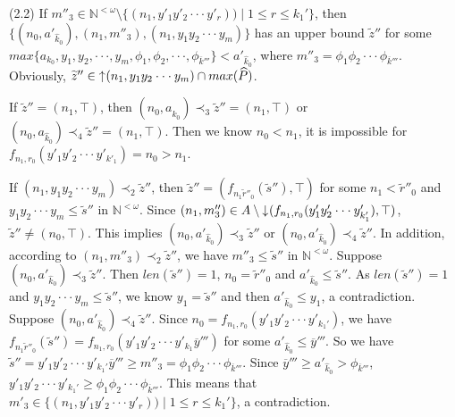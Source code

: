 \documentclass[preprint,12pt]{elsarticle}
\numberwithin{equation}{section}
\newcommand{\dn}{\mathord{\downarrow}\hspace{0.05em}}
\newcommand{\up}{\mathord{\uparrow}\hspace{0.05em}}
\begin{document}
(2.2) If $m''_{3}\in\mathbb{N}^{<\omega}\setminus\{(n_{1},y'_{1}y'_{2}\cdot\cdot\cdot y'_{r}))\mid 1\leq r\leq k_{1}'\}$, then $\{(n_{0},a'_{\widehat{k}_{0}}),(n_{1},m''_{3}),(n_{1},y_{1}y_{2}\cdot\cdot\cdot y_{m})\}$ has an upper bound $\widetilde{z}''$ for some $max\{a_{k_{0}},y_{1},y_{2},\cdot\cdot\cdot,y_{m},\phi_{1},\phi_{2},\cdot\cdot\cdot,\phi_{\overline{k}'''}\}<a'_{\widehat{k}_{0}}$, where $m''_{3}=\phi_{1}\phi_{2}\cdot\cdot\cdot\phi_{\overline{k}'''}$. Obviously, $\widetilde{z}''\in\up(n_{1},y_{1}y_{2}\cdot\cdot\cdot y_{m})\cap max(\widehat{P})$.

If $\widetilde{z}''=(n_{1},\top)$, then  $(n_{0},a_{\widehat{k}_{0}})\prec_{3}\widetilde{z}''=(n_{1},\top)$ or $(n_{0},a_{\widehat{k}_{0}})\prec_{4}\widetilde{z}''=(n_{1},\top)$. Then we know $n_{0}<n_{1}$, it is impossible for $f_{n_{1},r_{0}}(y'_{1}y'_{2}\cdot\cdot\cdot y'_{k'_{1}})=n_{0}>n_{1}$.

If $(n_{1},y_{1}y_{2}\cdot\cdot\cdot y_{m})\prec_{2}\widetilde{z}''$, then $\widetilde{z}''=(f_{n_{1}\widetilde{r}''_{0}}(\widetilde{s}''),\top)$ for some $n_{1}<\widetilde{r}''_{0}$ and $y_{1}y_{2}\cdot\cdot\cdot y_{m}\leq\widetilde{s}''$ in $\mathbb{N}^{<\omega}$. Since $(n_{1},m''_{3})\in A\setminus\dn(f_{n_{1},r_{0}}(y'_{1}y'_{2}\cdot\cdot\cdot y'_{k_{1}'}),\top)$, $\widetilde{z}''\neq (n_{0},\top)$. This implies $(n_{0},a'_{\widehat{k}_{0}})\prec_{3}\widetilde{z}''$ or $(n_{0},a'_{\widehat{k}_{0}})\prec_{4}\widetilde{z}''$. In addition, according to $(n_{1},m''_{3})\prec_{2}\widetilde{z}''$, we have $m''_{3}\leq\widetilde{s}''$ in $\mathbb{N}^{<\omega}$. Suppose $(n_{0},a'_{\widehat{k}_{0}})\prec_{3}\widetilde{z}''$. Then $len (\widetilde{s}'')=1$, $n_{0}=\widetilde{r}''_{0}$ and $a'_{\widehat{k}_{0}}\leq\widetilde{s}''$. As $len (\widetilde{s}'')=1$ and $y_{1}y_{2}\cdot\cdot\cdot y_{m}\leq\widetilde{s}''$, we know $y_{1}=\widetilde{s}''$ and then $a'_{\widehat{k}_{0}}\leq y_{1}$, a contradiction. Suppose $(n_{0},a'_{\widehat{k}_{0}})\prec_{4}\widetilde{z}''$. Since $n_{0}=f_{n_{1},r_{0}}(y'_{1}y'_{2}\cdot\cdot\cdot y'_{k_{1}'})$, we have $f_{n_{1}\widetilde{r}''_{0}}(\widetilde{s}'')=f_{n_{1},r_{0}}(y'_{1}y'_{2}\cdot\cdot\cdot y'_{k_{1}}\overline{y}''')$ for some $a'_{\widehat{k}_{0}}\leq \overline{y}'''$.
So we have $\widetilde{s}''=y'_{1}y'_{2}\cdot\cdot\cdot y'_{k_{1}'}\overline{y}'''\geq m''_{3}=\phi_{1}\phi_{2}\cdot\cdot\cdot\phi_{\overline{k}'''}$. Since $\overline{y}'''\geq a'_{\widehat{k}_{0}}>\phi_{\overline{k}'''}$, $y'_{1}y'_{2}\cdot\cdot\cdot y'_{k_{1}'}\geq \phi_{1}\phi_{2}\cdot\cdot\cdot\phi_{\overline{k}'''}$. This means that $m'_{3}\in\{(n_{1},y'_{1}y'_{2}\cdot\cdot\cdot y'_{r}))\mid 1\leq r\leq k_{1}'\} $, a contradiction.
\end{document}

